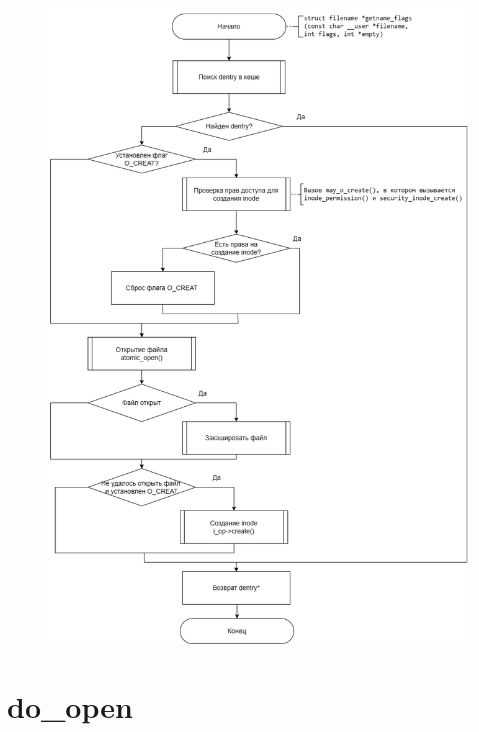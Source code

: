 \documentclass[12pt]{report}
\begin{document}
	\begin{figure}[H]
		\centering
		\includegraphics[scale=0.45]{lookup_open}
	\end{figure}
	
		\section{do\_open}
	
\end{document}
